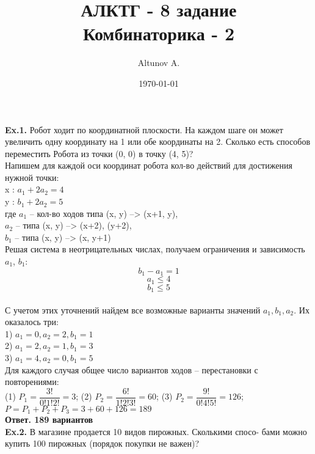 \documentclass[a4paper,12pt]{article}
\author{Altunov A.}
\title{АЛКТГ - 8 задание
\\
Комбинаторика - 2}
\date{\today}
\begin{document}
\maketitle
\newpage
\textbf{Ex.1.} Робот ходит по координатной плоскости. На каждом шаге он
может увеличить одну координату на 1 или обе координаты на 2.
Сколько есть способов переместить Робота из точки (0, 0) в точку
(4, 5)?
\\

Напишем для каждой оси координат робота кол-во действий для достижения нужной точки:
\\
x : $ a_1 + 2a_2 = 4 $
\\
y : $ b_1 + 2a_2 = 5 $
\\
где $a_1$ -- кол-во ходов типа (x, y) --> (x+1, y), 
\\
$a_2$ -- типа (x, y) --> (x+2), (y+2), 
\\
$b_1$ -- типа (x, y) --> (x, y+1)
\\
Решая система в неотрицательных числах, получаем ограничения и зависимость $a_1$, $b_1$:
\\
\begin{equation*}
b_1 - a_1 = 1
\end{equation*}
\begin{equation*}
a_1 \leq 4 
\end{equation*}
\begin{equation*}
b_1 \leq 5 
\end{equation*}
\\
С учетом этих уточнений найдем все возможные варианты значений $ a_1, b_1, a_2 $. Их оказалось три:
\\
1) $ a_1 = 0, a_2 = 2, b_1 = 1 $
\\
2) $ a_1 = 2, a_2 = 1, b_1 = 3 $
\\
3) $ a_1 = 4, a_2 = 0, b_1 = 5 $
\\
Для каждого случая общее число вариантов ходов -- перестановки с повторениями:
\\
(1) $ P_1 = \dfrac{3!}{0!1!2!} = 3 $; 
(2) $ P_2 = \dfrac{6!}{1!2!3!} = 60 $;
(3) $ P_2 = \dfrac{9!}{0!4!5!} = 126 $;
\\
$ P = P_1 + P_2 + P_3 = 3 + 60 + 126 = 189 $
\\

\textbf{Ответ. 189 вариантов}
\\

\textbf{Ex.2.} В магазине продается 10 видов пирожных. Сколькими спосо-
бами можно купить 100 пирожных (порядок покупки не важен)?
\\
\end{document}

